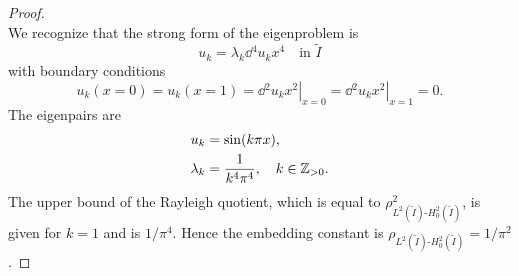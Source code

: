 \begin{lemma}
\begin{proof}
\begin{equation*}
    \end{equation*}
    We recognize that the strong form of the eigenproblem is
    \begin{equation*}
      u_k = \lambda_k \dd{^4u_k}{x^4} \quad \text{in } \tilde I
    \end{equation*}
    with boundary conditions
    \begin{equation*}
      u_k(x=0) = u_k(x=1) = \left. \dd{^2u_k}{x^2} \right|_{x=0}
      = \left. \dd{^2u_k}{x^2} \right|_{x=1} = 0.
    \end{equation*}
    The eigenpairs are
    \begin{align*}
      u_k &= \sin(k \pi x),\\
      \lambda_k &= \frac{1}{k^4 \pi^4}, \quad k \in \mathbb{Z}_{>0}.
    \end{align*}
    The upper bound of the Rayleigh quotient, which is equal to $ \rho_{L^2(\tilde I)\text{-}H^2_0(\tilde I)}^2$, is given for $k = 1$ and is $1/\pi^4$.  Hence the embedding constant is $\rho_{L^2(\tilde I)\text{-}H^2_0(\tilde I)} = 1/\pi^2$.
  \end{proof}
\end{lemma}

